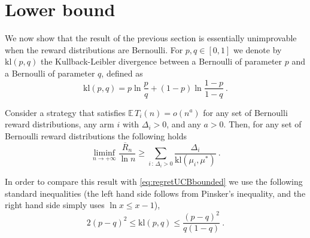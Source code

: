 \documentclass[11pt]{hackednow}
\newcommand{\kl}{\mathrm{kl}}
\newcommand{\E}{\mathbb{E}}
\newcommand{\oR}{\overline{R}}
\begin{document}
\section{Lower bound}
\label{s:stoch-lower}
We now show that the result of the previous section is essentially unimprovable when the reward distributions are Bernoulli. For $p, q \in [0,1]$ we denote by $\kl(p,q)$ the Kullback-Leibler divergence between a Bernoulli of parameter $p$ and a Bernoulli of parameter $q$, defined as
$$\kl(p,q) =p \ln\frac{p}{q} + (1-p) \ln\frac{1-p}{1-q}~.$$
%
\begin{theorem} \label{th:LR85}
Consider a strategy that satisfies $\E\,T_i(n) = o(n^a)$ for any set of Bernoulli reward distributions, any arm $i$ with $\Delta_i > 0$, and any $a>0$. 
Then, for any set of Bernoulli reward distributions the following holds
$$\liminf_{n \to +\infty} \frac{\oR_n}{\ln n} \geq \sum_{i \,:\, \Delta_i > 0} \frac{\Delta_i}{\kl(\mu_i,\mu^*)}~.$$
\end{theorem}
In order to compare this result with \eqref{eq:regretUCBbounded} we use the following standard inequalities (the left hand side follows from Pinsker's inequality, and the right hand side simply uses $\ln x \leq x -1$),
\begin{equation} \label{eq:klbernoullis}
2 (p-q)^2 \leq \kl(p,q) \leq \frac{(p-q)^2}{q(1-q)}~.
\end{equation}
%
\end{document}
